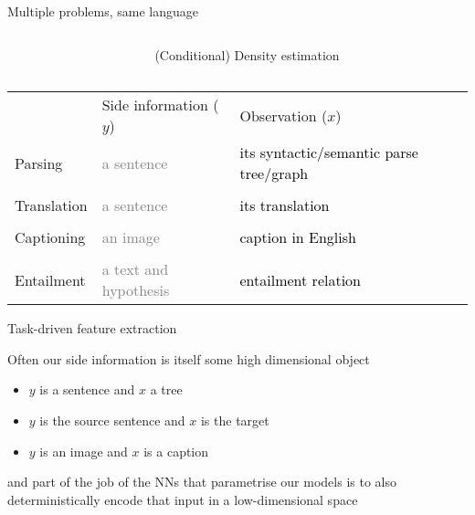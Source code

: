 \begin{frame}{Multiple problems, same language}



\begin{small}

\begin{columns}
\begin{column}{0.3\textwidth}
\end{column}
\begin{column}{0.6\textwidth}
\alert{(Conditional) Density estimation}
\end{column}

\end{columns}

\begin{tabular}{p{2cm} p{4cm} p{4cm}}
 & Side information ($y$) & Observation ($x$) \\
Parsing &   \textcolor{gray}{a sentence} & \textcolor{black}{its syntactic/semantic parse tree/graph} \\
&&\\
Translation &  \textcolor{gray}{a sentence} & \textcolor{black}{its translation} \\
&&\\
Captioning &  \textcolor{gray}{an image} & \textcolor{black}{caption in English} \\
&&\\
Entailment  & \textcolor{gray}{a text and hypothesis} & \textcolor{black}{entailment relation}
\end{tabular}
\end{small}

\end{frame}


\begin{frame}{Task-driven feature extraction}

Often our side information is itself some high dimensional object
\begin{itemize}
	\item $y$ is a sentence and $x$ a tree
	\item $y$ is the source sentence and $x$ is the target
	\item $y$ is an image and $x$ is a caption
\end{itemize}
and part of the job of the NNs that parametrise our models is to also \alert{deterministically} encode that input in a low-dimensional space


\end{frame}


